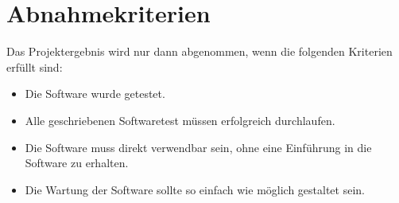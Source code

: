 \chapter{Abnahmekriterien}
Das Projektergebnis wird nur dann abgenommen, wenn die folgenden Kriterien erfüllt sind:\\
\begin{itemize}
\item Die Software wurde getestet.
\item Alle geschriebenen Softwaretest müssen erfolgreich durchlaufen.
\item Die Software muss direkt verwendbar sein, ohne eine Einführung in die Software zu erhalten.
\item Die Wartung der Software sollte so einfach wie möglich gestaltet sein.
\end{itemize}
